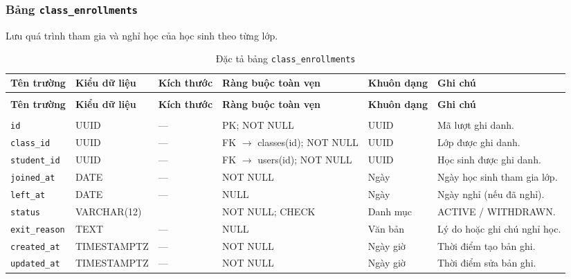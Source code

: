 \subsubsection{Bảng \texttt{class\_enrollments}}
Lưu quá trình tham gia và nghỉ học của học sinh theo từng lớp.

\begingroup
\fontsize{9.2}{11.2}\selectfont
\setlength{\tabcolsep}{2.4pt}
\renewcommand{\arraystretch}{1.22}
\begin{longtable}{|>{\raggedright\arraybackslash}p{2.25cm}|>{\raggedright\arraybackslash}p{2.48cm}|>{\raggedright\arraybackslash}p{0.95cm}|>{\raggedright\arraybackslash}p{3.0cm}|>{\raggedright\arraybackslash}p{1.25cm}|>{\raggedright\arraybackslash}p{4.27cm}|}
\caption{Đặc tả bảng \texttt{class\_enrollments}}\label{tab:csdl:class_enrollments}\\
\hline\rowcolor{blue!11}\textbf{Tên trường}&\textbf{Kiểu dữ liệu}&\textbf{Kích thước}&\textbf{Ràng buộc toàn vẹn}&\textbf{Khuôn dạng}&\textbf{Ghi chú}\\\hline
\endfirsthead
\multicolumn{6}{r}{\textit{Tiếp bảng \texttt{class\_enrollments}}}\\
\hline\rowcolor{blue!11}\textbf{Tên trường}&\textbf{Kiểu dữ liệu}&\textbf{Kích thước}&\textbf{Ràng buộc toàn vẹn}&\textbf{Khuôn dạng}&\textbf{Ghi chú}\\\hline
\endhead
\hline\multicolumn{6}{r}{\footnotesize\textit{Còn tiếp trang sau}}\\
\endfoot
\hline
\endlastfoot
\texttt{id} & UUID & — & PK; NOT NULL & UUID & Mã lượt ghi danh.\\\hline
\rowcolor{gray!5}
\texttt{class\_\allowbreak{}id} & UUID & — & FK $\rightarrow$ classes(id); NOT NULL & UUID & Lớp được ghi danh.\\\hline
\texttt{student\_\allowbreak{}id} & UUID & — & FK $\rightarrow$ users(id); NOT NULL & UUID & Học sinh được ghi danh.\\\hline
\rowcolor{gray!5}
\texttt{joined\_\allowbreak{}at} & DATE & — & NOT NULL & Ngày & Ngày học sinh tham gia lớp.\\\hline
\texttt{left\_\allowbreak{}at} & DATE & — & NULL & Ngày & Ngày nghỉ (nếu đã nghỉ).\\\hline
\rowcolor{gray!5}
\texttt{status} & VARCHAR(12) & 12 & NOT NULL; CHECK & Danh mục & ACTIVE / WITHDRAWN.\\\hline
\texttt{exit\_\allowbreak{}reason} & TEXT & — & NULL & Văn bản & Lý do hoặc ghi chú nghỉ học.\\\hline
\rowcolor{gray!5}
\texttt{created\_\allowbreak{}at} & TIMESTAMPTZ & — & NOT NULL & Ngày giờ & Thời điểm tạo bản ghi.\\\hline
\texttt{updated\_\allowbreak{}at} & TIMESTAMPTZ & — & NOT NULL & Ngày giờ & Thời điểm sửa bản ghi.\\\hline
\end{longtable}
\endgroup

